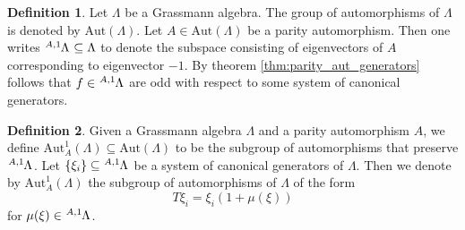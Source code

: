 \documentclass{article}
\theoremstyle{definition}
\newtheorem{definition}{Definition}
\begin{document}
\begin{definition}
    Let $\Lambda$ be a Grassmann algebra. The group of automorphisms of $\Lambda$ is denoted by $\text{Aut} (\Lambda)$. Let $A \in \text{Aut}(\Lambda)$ be a parity automorphism. Then one writes $\tensor[^{A, 1}]{\Lambda}{} \subseteq \Lambda$ to denote the subspace consisting of eigenvectors of $A$ corresponding to eigenvector $-1$. By theorem \ref{thm:parity_aut_generators} follows that $f \in \tensor[^{A, 1}]{\Lambda}{}$ are odd with respect to some system of canonical generators.
\end{definition}

\begin{definition}
    Given a Grassmann algebra $\Lambda$ and a parity automorphism $A$, we define $\text{Aut}_A^1(\Lambda) \subseteq \text{Aut}(\Lambda)$ to be the subgroup of automorphisms that preserve $\tensor[^{A, 1}]{\Lambda}{}$. Let $\left\{ \xi_i \right\} \subseteq \tensor[^{A, 1}]{\Lambda}{}$ be a system of canonical generators of $\Lambda$. Then we denote by $\text{Aut}_A^1(\Lambda)$ the subgroup of automorphisms of $\Lambda$ of the form
    \begin{equation*}
        T \xi_i = \xi_i (1 + \mu(\xi))
    \end{equation*}
    for $\mu(\xi) \in \tensor[^{A, 1}]{\Lambda}{}$.
\end{definition}
\end{document}
